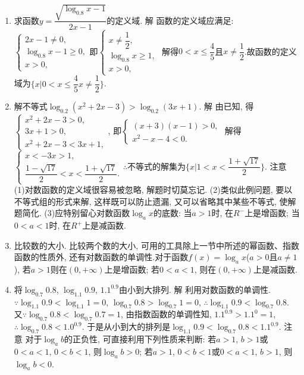 \documentclass[10pt,a4paper]{article}
\begin{document}
\begin{enumerate}[1.]
\item 求函数$y=\dfrac{\sqrt {\log _{0.8}x-1}}{2x-1}$的定义域.
解  函数的定义域应满足: $\begin{cases} 2x-1\ne 0, \\ \log _{0.8}x-1\ge 0, \\ x>0, \end{cases}$即$\begin{cases} x\ne \dfrac 12, \\ \log _{0.8}x\ge 1, \\ x>0, \end{cases}$
解得$0<x\le \dfrac 45$且$x\ne \dfrac 12$.故函数的定义域为$\{x|0<x\le \dfrac 45x\ne \dfrac 12\}$.
\item 解不等式$\log _{0.2}(x^2+2x-3)>\log _{0.2}(3x+1)$.
解  由已知, 得$\begin{cases} x^2+2x-3>0, \\ 3x+1>0, \\ x^2+2x-3<3x+1, \end{cases}$, 即$\begin{cases} (x+3)(x-1)>0, \\ x^2-x-4<0. \end{cases}$
解得$\begin{cases} x<-3x>1, \\ \dfrac{1-\sqrt {17}}2<x<\dfrac{1+\sqrt {17}}2. \end{cases}\therefore$不等式的解集为$\{x|1<x<\dfrac{1+\sqrt {17}}2\}$.
注意  (1)对数函数的定义域很容易被忽略, 解题时切莫忘记.
(2)类似此例问题, 要以不等式组的形式来解, 这样既可以防止遗漏, 又可以省略其中某些不等式, 使解题简化.
(3)应特别留心对数函数$\log _ax$的底数: 当$a>1$时, 在$R^-$上是增函数; 当$0<a<1$时, 在$R^+$上是减函数.
\item 比较数的大小.
比较两个数的大小, 可用的工具除上一节中所述的幂函数、指数函数的性质外, 还有对数函数的单调性.对于函数$f(x)=\log _ax$($a>0$且$a\ne 1$), 若$a>1$则在$(0,+\infty)$上是增函数; 若$0<a<1$, 则在$(0,+\infty)$上是减函数.
\item 将$\log _{0.7}0.8$, $\log _{1.1}0.9$, $1.1^{0.9}$由小到大排列.
解  利用对数函数的单调性.
$\because \log _{1.1}0.9<\log _{1.1}1=0$, $\log _{0.7}0.8>\log _{0.7}1=0$, $\therefore \log _{1.1}0.9<\log _{0.7}0.8$.
又$\because \log _{0.7}0.8<\log _{0.7}0.7=1$, 由指数函数的单调性知, $1.1^{0.9}>1.1^0=1$,
$\therefore \log _{0.7}0.8<1.0^{0.9}$.
于是从小到大的排列是$\log _{1.1}0.9<\log _{0.7}0.8<1.1^{0.9}$.
注意  对于$\log _ab$的正负性, 可直接利用下列性质来判断:
若$a>1$, $b>1$或$0<a<1$, $0<b<1$, 则$\log _ab>0$;
若$a>1$, $0<b<1$或$0<a<1$, $b>1$, 则$\log _ab<0$.

\end{enumerate}
\end{document}
